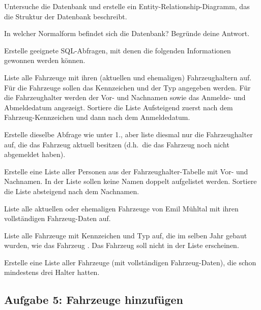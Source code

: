 \begin{compactenum}[a)]
\item Untersuche die Datenbank und erstelle ein Entity-Relationship-Diagramm,
das die Struktur der Datenbank beschreibt.

\item In welcher Normalform befindet sich die Datenbank? Begründe deine Antwort.

\item Erstelle geeignete SQL-Abfragen, mit denen die folgenden Informationen
gewonnen werden können.
\begin{compactenum}[1.]
\item Liste alle Fahrzeuge mit ihren (aktuellen und ehemaligen) Fahrzeughaltern
auf. Für die Fahrzeuge sollen das Kennzeichen und der Typ angegeben werden. Für
die Fahrzeughalter werden der Vor- und Nachnamen sowie das Anmelde- und
Abmeldedatum angezeigt. Sortiere die Liste Aufsteigend zuerst nach dem
Fahrzeug-Kennzeichen und dann nach dem Anmeldedatum.

\item Erstelle dieselbe Abfrage wie unter 1., aber liste diesmal nur die
Fahrzeughalter auf, die das Fahrzeug aktuell besitzen (d.h.\ die das Fahrzeug
noch nicht abgemeldet haben).

\item Erstelle eine Liste aller Personen aus der Fahrzeughalter-Tabelle mit Vor-
und Nachnamen. In der Liste sollen keine Namen doppelt aufgelistet werden.
Sortiere die Liste absteigend nach dem Nachnamen.

\item Liste alle aktuellen oder ehemaligen Fahrzeuge von Emil Mühltal mit ihren
 vollständigen Fahrzeug-Daten auf.

\item Liste alle Fahrzeuge mit Kennzeichen und Typ auf, die im selben Jahr
gebaut wurden, wie das Fahrzeug . Das Fahrzeug
 soll nicht in der Liste erscheinen.

\item Erstelle eine Liste aller Fahrzeuge (mit vollständigen Fahrzeug-Daten),
die schon mindestens drei Halter hatten.
\end{compactenum}
\end{compactenum}


\subsection{Aufgabe 5: Fahrzeuge hinzufügen}

